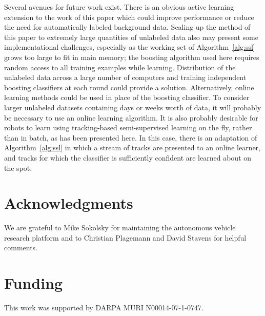 \documentclass[conference]{IEEEtran}
\begin{document}
Several avenues for future work exist.  There is an obvious active learning extension to the work of this paper which could improve performance or reduce the need for automatically labeled background data.  Scaling up the method of this paper to extremely large quantities of unlabeled data also may present some implementational challenges, especially as the working set \W of Algorithm~\ref{alg:ssl} grows too large to fit in main memory; the boosting algorithm used here requires random access to all training examples while learning.  Distribution of the unlabeled data across a large number of computers and training independent boosting classifiers at each round could provide a solution.  Alternatively, online learning methods could be used in place of the boosting classifier.  To consider larger unlabeled datasets containing days or weeks worth of data, it will probably be necessary to use an online learning algorithm.  It is also probably desirable for robots to learn using tracking-based semi-supervised learning on the fly, rather than in batch, as has been presented here.  In this case, there is an adaptation of Algorithm~\ref{alg:ssl} in which a stream of tracks are presented to an online learner, and tracks for which the classifier is sufficiently confident are learned about on the spot.

\section*{Acknowledgments}

We are grateful to Mike Sokolsky for maintaining the autonomous vehicle research platform and to Christian Plagemann and David Stavens for helpful comments.

\section*{Funding}
This work was supported by DARPA MURI N00014-07-1-0747.




%
\end{document}
